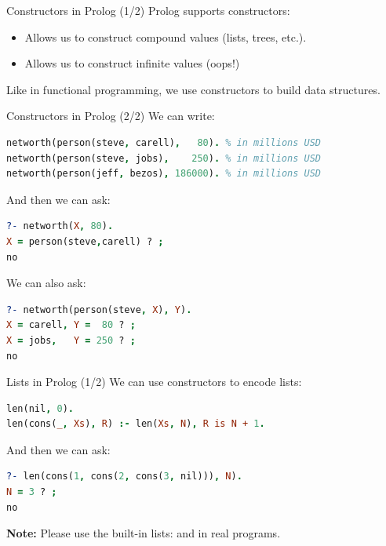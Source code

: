 \begin{frame}{Constructors in Prolog (1/2)}
Prolog supports constructors:

\begin{itemize}
    \item Allows us to construct compound values (lists, trees, etc.).
    \item Allows us to construct infinite values (oops!)
\end{itemize}

Like in functional programming, we use constructors to build data structures.
\end{frame}

\begin{frame}[fragile]{Constructors in Prolog (2/2)}
We can write:

\begin{lstlisting}[language=prolog, xleftmargin=0.5cm]
networth(person(steve, carell),   80). % in millions USD
networth(person(steve, jobs),    250). % in millions USD
networth(person(jeff, bezos), 186000). % in millions USD
\end{lstlisting}

\pause

And then we can ask:

\begin{lstlisting}[language=prolog, xleftmargin=0.5cm]
?- networth(X, 80).
X = person(steve,carell) ? ;
no
\end{lstlisting}

\pause

We can also ask:

\begin{lstlisting}[language=prolog, xleftmargin=0.5cm]
?- networth(person(steve, X), Y).
X = carell, Y =  80 ? ;
X = jobs,   Y = 250 ? ;
no
\end{lstlisting}
\end{frame}

\begin{frame}[fragile]{Lists in Prolog (1/2)}
We can use constructors to encode lists:

\begin{lstlisting}[language=prolog, xleftmargin=0.5cm]
len(nil, 0).
len(cons(_, Xs), R) :- len(Xs, N), R is N + 1.
\end{lstlisting}

\pause

And then we can ask:

\begin{lstlisting}[language=prolog, xleftmargin=0.5cm]
?- len(cons(1, cons(2, cons(3, nil))), N).
N = 3 ? ;
no
\end{lstlisting}

\pause

\textbf{Note:} Please use the built-in lists: \Code{[]} and 
in real programs. 
\end{frame}

